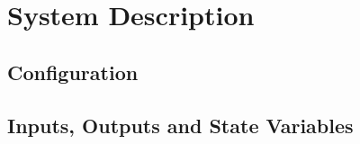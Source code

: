 \chapter{System Description} 

\section{Configuration}
%	




\section{Inputs, Outputs and State Variables}

